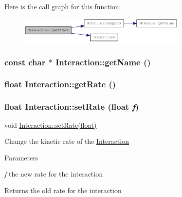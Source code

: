 Here is the call graph for this function:\nopagebreak
\begin{figure}[H]
\begin{center}
\leavevmode
\includegraphics[width=238pt]{classInteraction_a6328831e714adf9c8177f6052d2e017f_cgraph}
\end{center}
\end{figure}
\hypertarget{classInteraction_a64c55f6b12dca30cc1793c30614220f4}{
\subsubsection[{getName}]{\setlength{\rightskip}{0pt plus 5cm}const char $\ast$ Interaction::getName ()}}
\label{classInteraction_a64c55f6b12dca30cc1793c30614220f4}
\hypertarget{classInteraction_a5ff512276a432b6aa172e719d4866131}{
\subsubsection[{getRate}]{\setlength{\rightskip}{0pt plus 5cm}float Interaction::getRate ()}}
\label{classInteraction_a5ff512276a432b6aa172e719d4866131}
\hypertarget{classInteraction_a82197452596f6bd849df062c5f9d9714}{
\subsubsection[{setRate}]{\setlength{\rightskip}{0pt plus 5cm}float Interaction::setRate (float {\em f})}}
\label{classInteraction_a82197452596f6bd849df062c5f9d9714}
void \hyperlink{classInteraction_a82197452596f6bd849df062c5f9d9714}{Interaction::setRate(float)}

Change the kinetic rate of the \hyperlink{classInteraction}{Interaction}


\begin{DoxyParams}{Parameters}
\item[{\em f}]the new rate for the interaction\end{DoxyParams}
\begin{DoxyReturn}{Returns}
the old rate for the interaction 
\end{DoxyReturn}


